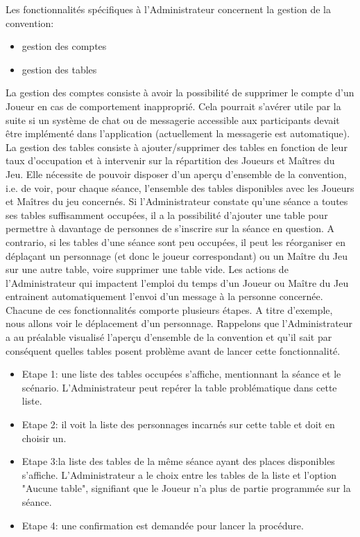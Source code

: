 \documentclass[11pt]{article}
\begin{document}
Les fonctionnalités spécifiques à l'Administrateur concernent la gestion de la convention:
\begin{itemize}
\item{gestion des comptes}
\item{gestion des tables\\}
\end{itemize}

La gestion des comptes consiste à avoir la possibilité de supprimer le compte d'un Joueur en cas de comportement inapproprié. Cela pourrait s'avérer utile par la suite si un système de chat ou de messagerie accessible aux participants devait être implémenté dans l'application (actuellement la messagerie est automatique).\\

La gestion des tables consiste à ajouter/supprimer des tables en fonction de leur taux d'occupation et à intervenir sur la répartition des Joueurs et Maîtres du Jeu. Elle nécessite de pouvoir disposer d'un aperçu d'ensemble de la convention, i.e. de voir, pour chaque séance, l'ensemble des tables disponibles avec les Joueurs et Maîtres du jeu concernés. Si l'Administrateur constate qu'une séance a toutes ses tables suffisamment occupées, il a la possibilité d'ajouter une table pour permettre à davantage de personnes de s'inscrire sur la séance en question. A contrario, si les tables d'une séance sont peu occupées, il peut les réorganiser en déplaçant un personnage (et donc le joueur correspondant) ou un Maître du Jeu sur une autre table, voire supprimer une table vide. Les actions de l'Administrateur qui impactent l'emploi du temps d'un Joueur ou Maître du Jeu entrainent automatiquement l'envoi d'un message à la personne concernée.\\

Chacune de ces fonctionnalités comporte plusieurs étapes. A titre d'exemple, nous allons voir le déplacement d'un personnage. Rappelons que l'Administrateur a au préalable visualisé l'aperçu d'ensemble de la convention et qu'il sait par conséquent quelles tables posent problème avant de lancer cette fonctionnalité. 
\begin{itemize}
    \item Etape 1: une liste des tables occupées s'affiche, mentionnant la séance et le scénario. L'Administrateur peut repérer la table problématique dans cette liste.
    \item Etape 2: il voit la liste des personnages incarnés sur cette table et doit en choisir un.
    \item Etape 3:la liste des tables de la même séance ayant des places disponibles s'affiche. L'Administrateur a le choix entre les tables de la liste et l'option "Aucune table", signifiant que le Joueur n'a plus de partie programmée sur la séance.
    \item Etape 4: une confirmation est demandée pour lancer la procédure.
\end{itemize}
\end{document}
